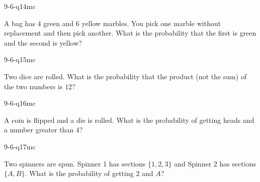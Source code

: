 \begin{practiceQuestion}{9-6-q14}{mc}
\begin{questionText}
A bag has $4$ green and $6$ yellow marbles. You pick one marble without replacement and then pick another. What is the probability that the first is green and the second is yellow?
\end{questionText}
\end{practiceQuestion}

\begin{practiceQuestion}{9-6-q15}{mc}
\begin{questionText}
Two dice are rolled. What is the probability that the product (not the sum) of the two numbers is $12$?
\end{questionText}
\end{practiceQuestion}

\begin{practiceQuestion}{9-6-q16}{mc}
\begin{questionText}
A coin is flipped and a die is rolled. What is the probability of getting heads and a number greater than $4$?
\end{questionText}
\end{practiceQuestion}

\begin{practiceQuestion}{9-6-q17}{mc}
\begin{questionText}
Two spinners are spun. Spinner 1 has sections $\{1, 2, 3\}$ and Spinner 2 has sections $\{A, B\}$. What is the probability of getting $2$ and $A$?
\end{questionText}
\end{practiceQuestion}

